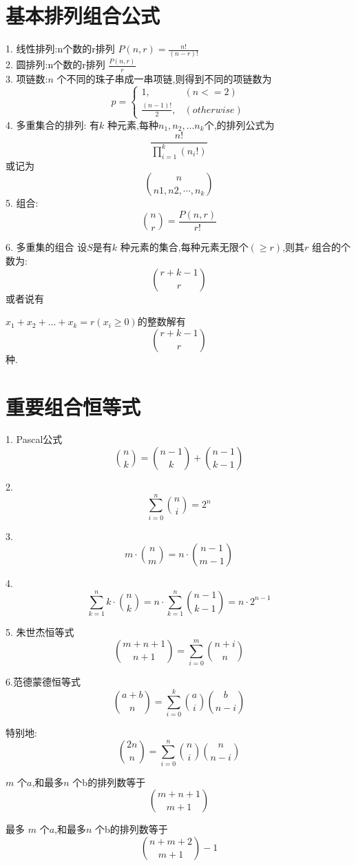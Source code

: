 \section{基本排列组合公式}
1. 线性排列:n个数的r排列 $P(n,r)=\frac{n!}{(n-r)!}$\\
2. 圆排列:n个数的r排列 $\frac{P(n,r)}{r}$\\
3. 项链数:$n$ 个不同的珠子串成一串项链,则得到不同的项链数为
$$
p=\begin{cases}
  1,& \left( n<=2\right) \\
  \frac{(n-1)!}{2},& \left( otherwise\right)
  \end{cases}
$$
4. 多重集合的排列: 有$k$ 种元素,每种$n_1,n_2,\dots n_k$个,的排列公式为
$$
\frac{n!}{\prod_{i=1}^{k}\left(n_i!\right)} 
$$
或记为
$$
\binom{n}{n1,n2,\cdots,n_k} 
$$
5. 组合: 
$$
\binom{n}{r}=\frac{P(n,r)}{r!} 
$$

6. 多重集的组合
设$S$是有$k$ 种元素的集合,每种元素无限个$(\geq r)$,则其$r$ 组合的个数为:
$$
\binom{r+k-1}{r} 
$$
或者说有
\begin{proposition}
$x_1+x_2+\dots+x_k=r(x_i\geq 0)$的整数解有
$$
\binom{r+k-1}{r} 
$$
种.
\end{proposition}


\section{重要组合恒等式}
1. Pascal公式
$$
\binom{n}{k}=\binom{n-1}{k}+\binom{n-1}{k-1} 
$$

2.
$$
\sum_{i=0}^{n} \binom{n}{i}=2^n 
$$

3. 
$$
 m\cdot \binom{n}{m}=n\cdot \binom{n-1}{m-1}
$$

4.
$$ 
\sum_{k=1}^{n} k\cdot\binom{n}{k}=n\cdot \sum_{k=1}^{n}\binom{n-1}{k-1}=n\cdot2^{n-1} 
$$

5. 朱世杰恒等式
$$
\binom{m+n+1}{n+1}=\sum_{i=0}^{m} \binom{n+i}{n}
$$

6.范德蒙德恒等式
$$
\binom{a+b}{n}=\sum_{i=0}^{k}\binom{a}{i}\binom{b}{n-i}
$$

特别地:
$$
\binom{2n}{n}=\sum_{i=0}^{n}\binom{n}{i}\binom{n}{n-i}
$$

\begin{proposition}
$m$ 个$a$,和最多$n$ 个b的排列数等于
$$
\binom{m+n+1}{m+1} 
$$
\end{proposition}

\begin{proposition}
  最多 $m$ 个$a$,和最多$n$ 个b的排列数等于
  $$
  \binom{n+m+2}{m+1}-1
  $$
\end{proposition}


